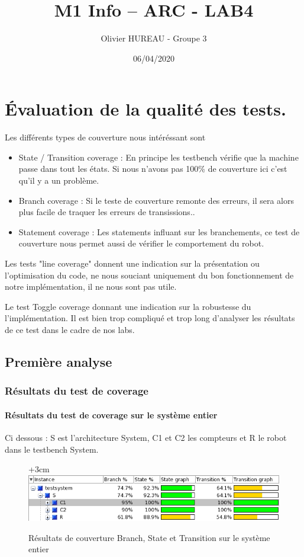 \documentclass{article}
\title{M1 Info – ARC - LAB4}
\author{Olivier HUREAU - Groupe 3}
\date{06/04/2020}
\begin{document}
\maketitle
\renewcommand{\contentsname}{Table des matières}
\tableofcontents
\newpage

\section{Évaluation de la qualité des tests.}
Les différents types de couverture nous intéréssant sont 
\begin{itemize}
	\item State / Transition coverage : En principe les testbench vérifie que la machine passe dans tout les états. Si nous n'avons pas 100\% de couverture ici c'est qu'il y a un problème.
		\item Branch coverage : Si le teste de couverture remonte des erreurs, il sera alors plus facile de traquer les erreurs de transissions..
	\item Statement coverage : Les statements influant sur les branchements, ce test de couverture nous permet aussi de vérifier le comportement du robot.

\end{itemize}

Les tests "line coverage"  donnent une indication sur la présentation ou l'optimisation du code, ne nous souciant uniquement du bon fonctionnement de notre implémentation, il ne nous sont pas utile.

Le test Toggle coverage donnant une indication sur la robustesse du l'implémentation. Il est bien trop compliqué et trop long d'analyser les résultats de ce test dans le cadre de nos labs.


\subsection{Première analyse}

\subsubsection{Résultats du test de coverage}

\paragraph{Résultats du test de coverage sur le système entier}

Ci dessous : S est l'architecture System, C1 et C2 les compteurs et R le robot dans le testbench System.
\begin{figure}[!h]
\advance\leftskip+3cm
\includegraphics[scale=0.70]{PremiereAnalyse/Coverage.PNG}
\caption{Résultats de couverture Branch, State et Transition sur le système entier}
\end{figure}
\end{document}
